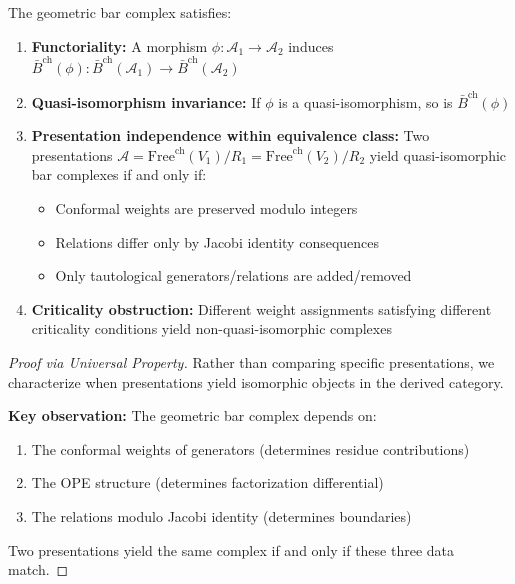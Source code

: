 \begin{theorem}\label{thm:presentation-independence}
   The geometric bar complex satisfies:
   \begin{enumerate}
   \item \textbf{Functoriality:} A morphism $\phi: \mathcal{A}_1 \to \mathcal{A}_2$ induces 
   $\bar{B}^{\text{ch}}(\phi): \bar{B}^{\text{ch}}(\mathcal{A}_1) \to \bar{B}^{\text{ch}}(\mathcal{A}_2)$
   
   \item \textbf{Quasi-isomorphism invariance:} If $\phi$ is a quasi-isomorphism, so is $\bar{B}^{\text{ch}}(\phi)$
   
   \item \textbf{Presentation independence within equivalence class:} Two presentations 
   $\mathcal{A} = \text{Free}^{\text{ch}}(V_1)/R_1 = \text{Free}^{\text{ch}}(V_2)/R_2$ 
   yield quasi-isomorphic bar complexes if and only if:
      \begin{itemize}
      \item Conformal weights are preserved modulo integers
      \item Relations differ only by Jacobi identity consequences
      \item Only tautological generators/relations are added/removed
      \end{itemize}
      
   \item \textbf{Criticality obstruction:} Different weight assignments satisfying different criticality 
   conditions yield non-quasi-isomorphic complexes
   \end{enumerate}
   \end{theorem}
   
   \begin{proof}[Proof via Universal Property]
   Rather than comparing specific presentations, we characterize when presentations yield isomorphic 
   objects in the derived category.
   
   \textbf{Key observation:} The geometric bar complex depends on:
   \begin{enumerate}
   \item The conformal weights of generators (determines residue contributions)
   \item The OPE structure (determines factorization differential)  
   \item The relations modulo Jacobi identity (determines boundaries)
   \end{enumerate}
   
   Two presentations yield the same complex if and only if these three data match.
   \end{proof}
   
